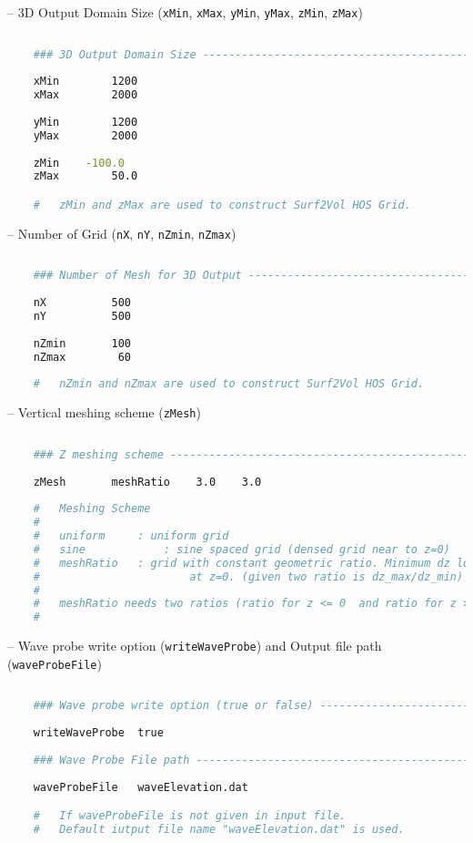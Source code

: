 	\pagebreak
	
	-- 3D Output Domain Size (\texttt{xMin}, \texttt{xMax}, \texttt{yMin}, \texttt{yMax}, \texttt{zMin}, \texttt{zMax})
	
	\begin{lstlisting}[language=bash]
	
	### 3D Output Domain Size ------------------------------------------ #
	
	xMin		1200
	xMax		2000
	
	yMin		1200
	yMax		2000
	
	zMin	-100.0
	zMax		50.0	

	# 	zMin and zMax are used to construct Surf2Vol HOS Grid.
	\end{lstlisting}
	
	-- Number of Grid (\texttt{nX}, \texttt{nY}, \texttt{nZmin}, \texttt{nZmax})
	
	\begin{lstlisting}[language=bash]
	
	### Number of Mesh for 3D Output ----------------------------------- #
	
	nX          500
	nY          500
	
	nZmin       100
	nZmax        60
	
	# 	nZmin and nZmax are used to construct Surf2Vol HOS Grid.
	\end{lstlisting}
	
	-- Vertical meshing scheme (\texttt{zMesh})
	
	\begin{lstlisting}[language=bash]
	
	### Z meshing scheme ----------------------------------------------- #
	
	zMesh       meshRatio    3.0    3.0
	
	#	Meshing Scheme
	#	
	#	uniform 	: uniform grid 
	#	sine			: sine spaced grid (densed grid near to z=0)
	#	meshRatio	: grid with constant geometric ratio. Minimum dz located  
	#					    at z=0. (given two ratio is dz_max/dz_min)
	#
	#	meshRatio needs two ratios (ratio for z <= 0  and ratio for z > 0)
	#
	\end{lstlisting}
	
	\pagebreak
	
	-- Wave probe write option (\texttt{writeWaveProbe}) and Output file path (\texttt{waveProbeFile})
	
	\begin{lstlisting}[language=bash]
	
	### Wave probe write option (true or false) ------------------------ #
	
	writeWaveProbe  true
	
	### Wave Probe File path ------------------------------------------- #
	
	waveProbeFile   waveElevation.dat

	#	If waveProbeFile is not given in input file. 
	#	Default iutput file name "waveElevation.dat" is used. 
	\end{lstlisting}
	
